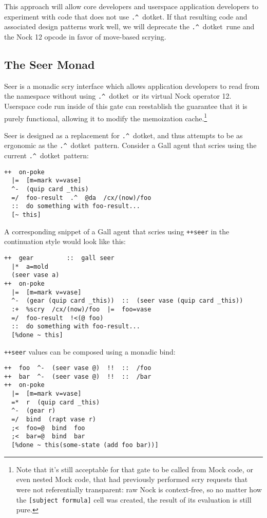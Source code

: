 \documentclass[twoside]{article}
\newcommand{\dotket}{\lstinline[style=inlinecode]{.^}~dotket}
\begin{document}
This approach will allow core developers and userspace application developers to experiment with code that does not use \dotket.  If that resulting code and associated design patterns work well, we will deprecate the \dotket~rune and the Nock 12 opcode in favor of move-based scrying.

\subsection{The Seer Monad}

Seer is a monadic scry interface which allows application developers to read from the namespace without using \dotket~or its virtual Nock operator 12.  Userspace code run inside of this gate can reestablish the guarantee that it is purely functional, allowing it to modify the memoization cache.\footnote{Note that it's still acceptable for that gate to be called from Mock code, or even nested Mock code, that had previously performed scry requests that were not referentially transparent:  raw Nock is context-free, so no matter how the \lstinline[style=inlinecode]{[subject formula]} cell was created, the result of its evaluation is still pure.}

Seer is designed as a replacement for \dotket, and thus attempts to be as ergonomic as the \dotket~pattern.  Consider a Gall agent that scries using the current \dotket~pattern:

\begin{lstlisting}[style=listingcode]
++  on-poke
  |=  [m=mark v=vase]
  ^-  (quip card _this)
  =/  foo-result  .^  @da  /cx/(now)/foo
  ::  do something with foo-result...
  [~ this]
\end{lstlisting}

A corresponding snippet of a Gall agent that scries using \lstinline[style=inlinecode]{++seer} in the continuation style would look like this:

\begin{lstlisting}[style=listingcode]
++  gear         ::  gall seer
  |*  a=mold
  (seer vase a)
++  on-poke
  |=  [m=mark v=vase]
  ^-  (gear (quip card _this))  ::  (seer vase (quip card _this))
  :+  %scry  /cx/(now)/foo  |=  foo=vase
  =/  foo-result  !<(@ foo)
  ::  do something with foo-result...
  [%done ~ this]
\end{lstlisting}

\lstinline[style=inlinecode]{++seer} values can be composed using a monadic bind:

\begin{lstlisting}[style=listingcode]
++  foo  ^-  (seer vase @)  !!  ::  /foo
++  bar  ^-  (seer vase @)  !!  ::  /bar
++  on-poke
  |=  [m=mark v=vase]
  =*  r  (quip card _this)
  ^-  (gear r)
  =/  bind  (rapt vase r)
  ;<  foo=@  bind  foo
  ;<  bar=@  bind  bar
  [%done ~ this(some-state (add foo bar))]
\end{lstlisting}
\end{document}
